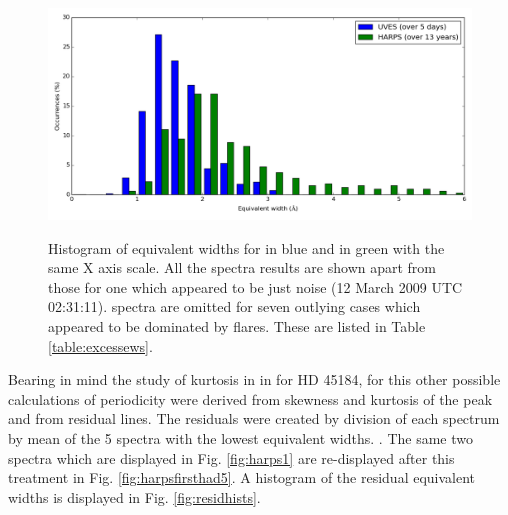 \begin{figure}[!htbp]
\begin{center}
\includegraphics[scale=0.4]{Figures/proxhists.png} \\
\end{center}
\caption{Histogram of equivalent widths for {\uves} in blue and {\harps} in green with the same X axis scale. All the
  {\uves} spectra results are shown apart from those for one which appeared to be just noise (12 March 2009 UTC
  02:31:11). {\harps} spectra are omitted for seven outlying cases which appeared to be dominated by flares. These are
  listed in Table \ref{table:excessews}.}
 \protect\label{fig:proxhists}
\end{figure}

Bearing in mind the study of kurtosis in {\ha} in \citet{flores16} for HD 45184, for this {\paperorthesis} other
possible calculations of periodicity were derived from skewness and kurtosis of the {\ha} peak and from residual {\ha}
lines. The residuals were created by division of each spectrum by mean of the 5 spectra with the lowest equivalent
widths. . The same two spectra which are
displayed in Fig. \ref{fig:harps1} are re-displayed after this treatment in Fig. \ref{fig:harpsfirsthad5}. A histogram
of the residual equivalent widths is displayed in Fig. \ref{fig:residhists}.

